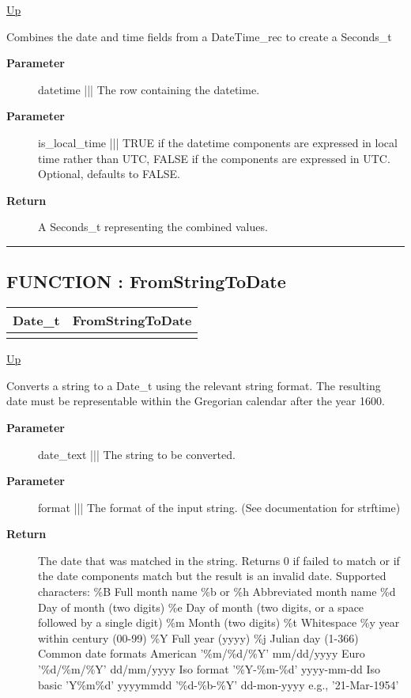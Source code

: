 \hyperlink{ecldoc:Date}{Up}

\par
Combines the date and time fields from a DateTime\_rec to create a Seconds\_t

\par
\begin{description}
\item [\textbf{Parameter}] datetime ||| The row containing the datetime.
\item [\textbf{Parameter}] is\_local\_time ||| TRUE if the datetime components are expressed in local time rather than UTC, FALSE if the components are expressed in UTC. Optional, defaults to FALSE.
\item [\textbf{Return}] A Seconds\_t representing the combined values.
\end{description}

\rule{\textwidth}{0.4pt}
\subsection*{FUNCTION : FromStringToDate}
\hypertarget{ecldoc:date.fromstringtodate}{}

{\renewcommand{\arraystretch}{1.5}
\begin{tabularx}{\textwidth}{|>{\raggedright\arraybackslash}l|X|}
\hline
\hspace{0pt}Date\_t & FromStringToDate \\
\hline
\multicolumn{2}{|>{\raggedright\arraybackslash}X|}{\hspace{0pt}(STRING date\_text, VARSTRING format)} \\
\hline
\end{tabularx}
}

\hyperlink{ecldoc:Date}{Up}

\par
Converts a string to a Date\_t using the relevant string format. The resulting date must be representable within the Gregorian calendar after the year 1600.

\par
\begin{description}
\item [\textbf{Parameter}] date\_text ||| The string to be converted.
\item [\textbf{Parameter}] format ||| The format of the input string. (See documentation for strftime)
\item [\textbf{Return}] The date that was matched in the string. Returns 0 if failed to match or if the date components match but the result is an invalid date. Supported characters: \%B Full month name \%b or \%h Abbreviated month name \%d Day of month (two digits) \%e Day of month (two digits, or a space followed by a single digit) \%m Month (two digits) \%t Whitespace \%y year within century (00-99) \%Y Full year (yyyy) \%j Julian day (1-366) Common date formats American '\%m/\%d/\%Y' mm/dd/yyyy Euro '\%d/\%m/\%Y' dd/mm/yyyy Iso format '\%Y-\%m-\%d' yyyy-mm-dd Iso basic 'Y\%m\%d' yyyymmdd '\%d-\%b-\%Y' dd-mon-yyyy e.g., '21-Mar-1954'
\end{description}


